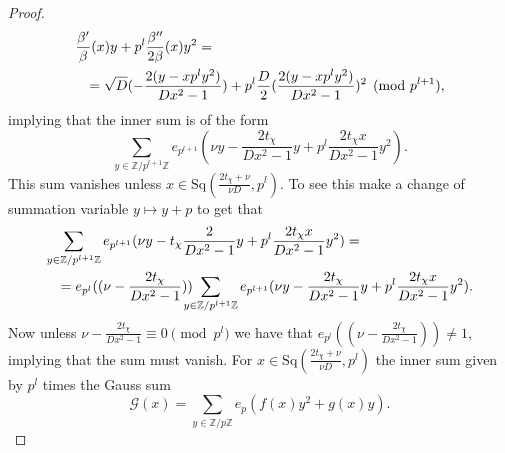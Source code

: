 \documentclass[12pt]{amsart}
\theoremstyle{definition}
\theoremstyle{remark}
\numberwithin{equation}{section}
\newcommand{\calG}{\mathcal{G}}
\newcommand{\bbZ}{\mathbb{Z}}
\newcommand{\Sq}{\mathrm{Sq}}
\begin{document}
\begin{proof}
\begin{eqnarray*}
\lefteqn{\frac{\beta'}{\beta}(x)y+p^{l}\frac{\beta''}{2\beta}(x)y^2=}\\
&&=\sqrt{D}(-\frac{2(y-xp^ly^2)}{Dx^2-1})+
p^{l}\frac{D}{2}(\frac{2(y-xp^ly^2)}{Dx^2-1})^2\pmod{p^{l+1}},
\end{eqnarray*}
implying that the inner sum is of the form
 \[\sum_{y\in\bbZ/p^{l+1}\bbZ}e_{p^{l+1}}(\nu y-\frac{2t_\chi}{Dx^2-1}y+p^l\frac{2t_\chi x}{Dx^2-1}y^2).\]
This sum vanishes unless $x\in \Sq(\frac{2t_\chi+\nu}{\nu D},p^l)$.
To see this make a change of summation variable $y\mapsto y+p$ to
get that
\begin{eqnarray*}
\lefteqn{\sum_{y\in\bbZ/p^{l+1}\bbZ}e_{p^{l+1}}(\nu
y-t_\chi\frac{2}{Dx^2-1}y+p^l\frac{2t_\chi x}{Dx^2-1}y^2)=}\\
&&=e_{p^l}((\nu
-\frac{2t_\chi}{Dx^2-1}))\!\!\!\!\!\sum_{y\in\bbZ/p^{l+1}\bbZ}e_{p^{l+1}}(\nu
y-\frac{2t_\chi}{Dx^2-1}y+p^l\frac{2t_\chi x}{Dx^2-1}y^2).
\end{eqnarray*}
Now unless $\nu -\frac{2t_\chi}{Dx^2-1}\equiv 0\pmod{p^l}$ we have that $e_{p^l}((\nu -\frac{2t_\chi}{Dx^2-1}))\neq
1$, implying that the sum must vanish. For $x\in
\Sq(\frac{2t_\chi+\nu}{\nu D},p^l)$ the inner sum given by $p^l$
times the Gauss sum
\[\calG(x)=\sum_{y\in\bbZ/p\bbZ}e_p(f(x)y^2+g(x)y).\]
\end{proof}
\end{document}
